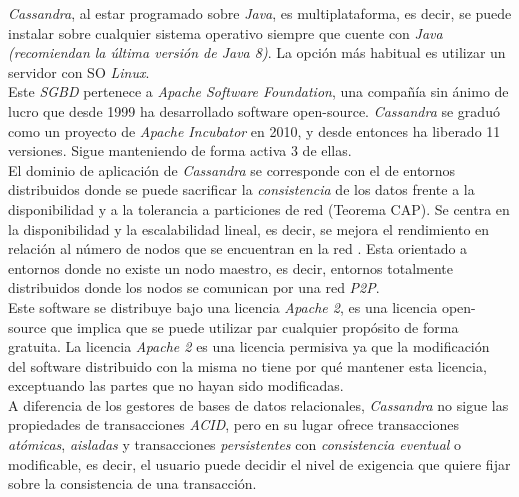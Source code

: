 \documentclass[11pt,a4paper]{article}
\begin{document}
\emph{Cassandra}, al estar programado sobre \emph{Java}, es multiplataforma, es decir, se puede instalar sobre cualquier sistema operativo siempre que cuente con \emph{Java (recomiendan la última versión de Java 8)}. La opción más habitual es utilizar un servidor con SO \emph{Linux}. \cite{AP:2}\\

Este \emph{SGBD} pertenece a \emph{Apache Software Foundation}, una compañía sin ánimo de lucro que desde 1999 ha desarrollado software open-source. \emph{Cassandra} se graduó como un proyecto de \emph{Apache Incubator} en 2010, y desde entonces ha liberado 11 versiones. Sigue manteniendo de forma activa 3 de ellas.\\

El dominio de aplicación de \emph{Cassandra} se corresponde con el de entornos distribuidos donde se puede sacrificar la \emph{consistencia} de los datos frente a la disponibilidad y a la tolerancia a particiones de red (Teorema CAP). Se centra en la disponibilidad y la escalabilidad lineal, es decir, se mejora el rendimiento en relación al número de nodos que se encuentran en la red \cite{WIKI:5}. Esta orientado a entornos donde no existe un nodo maestro, es decir, entornos totalmente distribuidos donde los nodos se comunican por una red \emph{P2P}.\\

Este software se distribuye bajo una licencia \emph{Apache 2}, es una licencia open-source que implica que se puede utilizar par cualquier propósito de forma gratuita. La licencia \emph{Apache 2} es una licencia permisiva ya que la modificación del software distribuido con la misma no tiene por qué mantener esta licencia, exceptuando las partes que no hayan sido modificadas. \cite{WIKI:6}\\

A diferencia de los gestores de bases de datos relacionales, \emph{Cassandra} no sigue las propiedades de transacciones \emph{ACID}, pero en su lugar ofrece transacciones \emph{atómicas}, \emph{aisladas} y transacciones \emph{persistentes} con \emph{consistencia eventual} o modificable, es decir, el usuario puede decidir el nivel de exigencia que quiere fijar sobre la consistencia de una transacción. \cite{DS:1} \\
\end{document}
